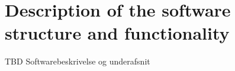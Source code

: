 \section{Description of the software structure and functionality}
TBD Softwarebeskrivelse og underafsnit